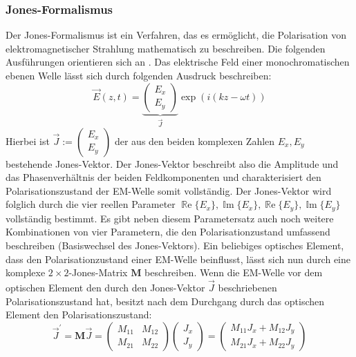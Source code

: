 \documentclass[titlepage,  ngerman]{article}
\renewcommand{\Re}{\operatorname{\mathbb{R}e}}
\renewcommand{\Im}{\operatorname{\mathbb{I}m}}
\begin{document}
	\subsubsection{Jones-Formalismus}
	Der Jones-Formalismus ist ein Verfahren, das es ermöglicht, die Polarisation von elektromagnetischer Strahlung mathematisch zu beschreiben. Die folgenden Ausführungen orientieren sich an \cite{Hecht.2018}. Das elektrische Feld einer monochromatischen ebenen Welle lässt sich durch folgenden Ausdruck beschreiben:
	\begin{equation}
		\vec{E}(z, t) = \underbrace{\begin{pmatrix}E_x \\ E_y\end{pmatrix}}_{\vec{J}} \exp(i(kz-\omega t))
	\end{equation}
	Hierbei ist $\vec{J} := \begin{pmatrix}E_x \\ E_y\end{pmatrix}$ der aus den beiden komplexen Zahlen $E_x, E_y$ bestehende Jones-Vektor. Der Jones-Vektor beschreibt also die Amplitude und das Phasenverhältnis der beiden Feldkomponenten und charakterisiert den Polarisationszustand der EM-Welle somit vollständig. Der Jones-Vektor wird folglich durch die vier reellen Parameter $\Re\{E_x\}, \Im\{E_x\}, \Re\{E_y\}, \Im\{E_y\}$ vollständig bestimmt. Es gibt neben diesem Parametersatz auch noch weitere Kombinationen von vier Parametern, die den Polarisationzustand umfassend beschreiben (Basiswechsel des Jones-Vektors).	Ein beliebiges optisches Element, dass den Polarisationzustand einer EM-Welle beinflusst, lässt sich nun durch eine komplexe $2 \times 2$-Jones-Matrix $\boldsymbol{M}$ beschreiben. Wenn die EM-Welle vor dem optischen Element den durch den Jones-Vektor $\vec{J}$ beschriebenen Polarisationszustand hat, besitzt nach dem Durchgang durch das optischen Element den Polarisationszustand:
	\begin{equation}
		\vec{J}^\prime = \boldsymbol{M} \vec{J}  =  
		\begin{pmatrix}
			M_{11} & M_{12} \\
			M_{21} & M_{22}
		\end{pmatrix}
		\begin{pmatrix}
			J_x \\
			J_y
		\end{pmatrix} = 
		\begin{pmatrix}
			M_{11} J_x + M_{12} J_y \\
			M_{21} J_x + M_{22} J_y
		\end{pmatrix}		
	\end{equation}
\end{document}
